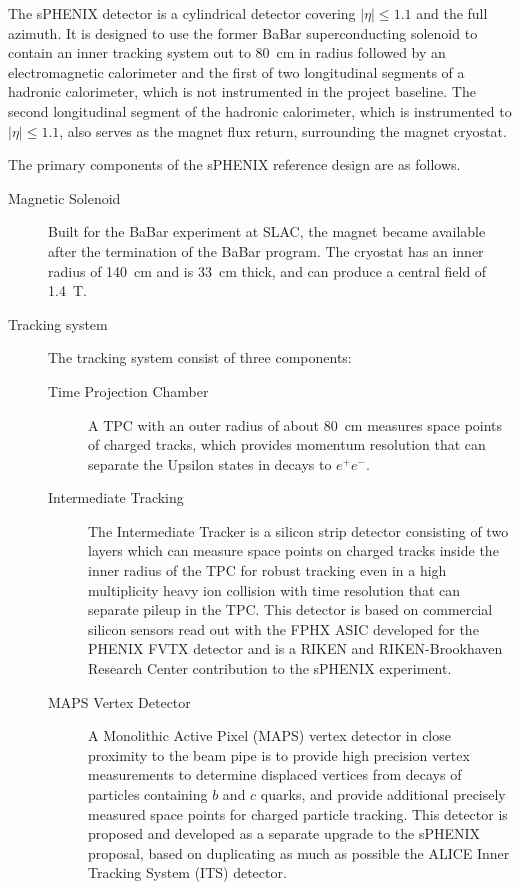 The sPHENIX detector is a cylindrical detector covering
$\left|\eta\right| \leq 1.1$ and the full azimuth.  It is designed to use
the former BaBar superconducting solenoid to contain
an inner tracking system out to 80~cm in radius followed by an
electromagnetic calorimeter and the first of two longitudinal segments of
a hadronic calorimeter, which is not instrumented in the project baseline.  The second
longitudinal segment of the hadronic calorimeter, which is instrumented to
$|\eta| \leq 1.1$, also serves as
the magnet flux return, surrounding the magnet cryostat.


The primary components of the sPHENIX reference design are as follows.

\begin{description}

\item[Magnetic Solenoid]  Built for the BaBar experiment at
  SLAC, the magnet became available after the termination of the BaBar
  program.  The cryostat has an inner radius of 140~cm and is 33~cm
  thick, and can produce a central field of 1.4~T.

\item[Tracking system] The tracking system consist of three components:

\begin{description}

\item[Time Projection Chamber] A TPC with an outer radius of about 80~cm
measures space points of charged tracks, which provides momentum resolution that can
separate the Upsilon states in decays to $e^+e^-$.

\item[Intermediate Tracking] The Intermediate Tracker is a silicon strip
detector consisting of two layers which can measure space points
on charged tracks inside the inner radius of the TPC for robust tracking
even in a high multiplicity heavy ion collision with time resolution that
can separate pileup in the TPC.
This detector is based on commercial silicon
sensors read out with the FPHX ASIC developed for the PHENIX FVTX detector and
is a RIKEN and RIKEN-Brookhaven Research Center contribution to the sPHENIX
experiment.

\item[MAPS Vertex Detector] A Monolithic Active Pixel (MAPS) vertex
detector in close proximity to the beam pipe is to provide high precision
vertex measurements to determine displaced vertices from decays
of particles containing $b$ and $c$ quarks, and provide additional precisely
measured space points for charged particle tracking.  This detector is
proposed and developed as a separate upgrade to the sPHENIX proposal,
based on duplicating as much as possible the ALICE Inner Tracking System (ITS)
detector.


\end{description}
\end{description}
